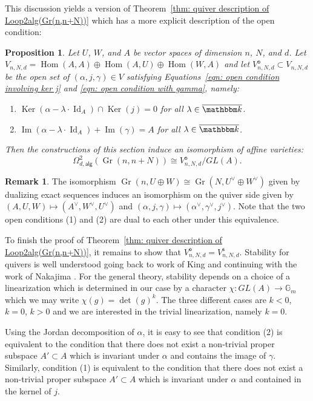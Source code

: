 \message{ !name(Bryan-Vakil.tex)}\documentclass{amsart}
\newtheorem{proposition}[theorem]{Proposition}
\theoremstyle{definition}
\newtheorem{remark}[theorem]{Remark}
\newcommand{\kk} {{\mathbbm k}}
\newcommand{\Hom}{\operatorname{Hom}}
\newcommand{\Ker}{\operatorname{Ker}}
\newcommand{\im}{\operatorname{Im}}
\newcommand{\alg}{\mathsf{alg}}
\newcommand{\open}{\mathsf{o}}
\newcommand{\stable}{\mathsf{s}}
\newcommand{\Gr}{\operatorname{Gr}}
\newcommand{\LoopTwo}{\Omega^{2}_{d,\alg}}
\newcommand{\Id}{\operatorname{Id}}
\begin{document}
This discussion yields a version of Theorem~\ref{thm: quiver description
of Loop2alg(Gr(n,n+N))} which has a more explicit description of the open
condition:

\begin{proposition}\label{prop: quiver description of Loop2(Gr(n,n+N))
with explicit stability condition}
Let $U$, $W$, and $A$ be vector spaces of dimension $n$, $N$, and
$d$. Let $V_{n,N,d} = \Hom (A,A)\oplus \Hom (A,U)\oplus \Hom (W,A)$ and let
$V^{\open}_{n,N,d}\subset V_{n,N,d}$ be the open set of $(\alpha ,j,\gamma )\in V$
satisfying Equations~\eqref{eqn: open condition involving ker j} and
\eqref{eqn: open condition with gamma}, namely:
\begin{enumerate}
\item $\Ker (\alpha -\lambda \cdot \Id_{A})\cap \Ker (j) = 0$ for all
$\lambda\in \overline{\kk} $.
\item  $\im (\alpha -\lambda \cdot \Id_{A})+  \im (\gamma )=A$ for
all $\lambda\in \overline{\kk} $.
\end{enumerate}
Then the constructions of this section induce an isomorphism of affine
varieties:
\[
\LoopTwo (\Gr (n,n+N))\cong V^{\open}_{n,N,d}/GL(A) .
\]
\end{proposition}


\begin{remark}\label{rem: duality induced by Gr(n,n+N)=Gr(N,n+N)}
The isomorphism $\Gr (n,U\oplus W)\cong \Gr (N,U^{\vee}\oplus
W^{\vee})$ given by dualizing exact sequences induces an isomorphism
on the quiver side given by $(A,U,W)\mapsto
(A^{\vee},W^{\vee},U^{\vee})$ and $(\alpha ,j,\gamma )\mapsto
(\alpha^{\vee},\gamma^{\vee},j^{\vee})$. Note that the two open
conditions (1) and (2) are dual to each other under this equivalence. 
\end{remark}


To finish the proof of Theorem~\ref{thm: quiver description of
Loop2alg(Gr(n,n+N))}, it remains to show that $V^{\open}_{n,N,d} =
V^{\stable}_{n,N,d}$. Stability for quivers is well understood going
back to work of King \cite{King-quivers} and continuing with the work
of Nakajima \cite{Nakajima-Duke88,Nakajima-Handsaw}. For the general
theory, stability depends on a choice of a linearization which is
determined in our case by a character $\chi : GL(A)\to \mathbb{G}_{m}$ which
we may write $\chi (g) = \operatorname{det}(g)^{k}$. The three
different cases are $k<0$, $k=0$, $k>0$ and we are interested in the
trivial linearization, namely $k=0$.

Using the Jordan decomposition of $\alpha$, it is easy to see that
condition (2) is equivalent to the condition that there does not exist
a non-trivial proper subspace $A'\subset A$ which is invariant under
$\alpha$ and contains the image of $\gamma$. Similarly, condition (1)
is equivalent to the condition that there does not exist a non-trivial
proper subspace $A'\subset A$ which is invariant under $\alpha$ and
contained in the kernel of $j$.
\end{document}
